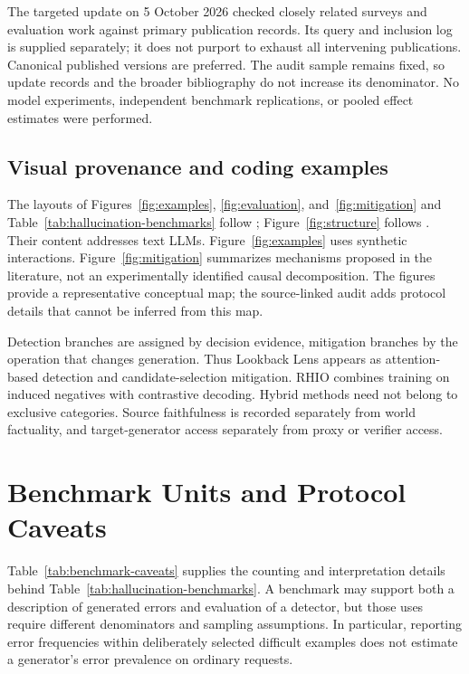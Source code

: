 The targeted update on 5 October 2026 checked closely related surveys and evaluation work against primary publication records. Its query and inclusion log is supplied separately; it does not purport to exhaust all intervening publications. Canonical published versions are preferred. The audit sample remains fixed, so update records and the broader bibliography do not increase its denominator. No model experiments, independent benchmark replications, or pooled effect estimates were performed.

\subsection{Visual provenance and coding examples}
The layouts of Figures~\ref{fig:examples}, \ref{fig:evaluation}, and~\ref{fig:mitigation} and Table~\ref{tab:hallucination-benchmarks} follow \citet{liu-etal-2024-lvlm-design}; Figure~\ref{fig:structure} follows \citet{liu-etal-2025-logical-design}. Their content addresses text LLMs. Figure~\ref{fig:examples} uses synthetic interactions. Figure~\ref{fig:mitigation} summarizes mechanisms proposed in the literature, not an experimentally identified causal decomposition. The figures provide a representative conceptual map; the source-linked audit adds protocol details that cannot be inferred from this map.

Detection branches are assigned by decision evidence, mitigation branches by the operation that changes generation. Thus Lookback Lens appears as attention-based detection and candidate-selection mitigation. RHIO combines training on induced negatives with contrastive decoding. Hybrid methods need not belong to exclusive categories. Source faithfulness is recorded separately from world factuality, and target-generator access separately from proxy or verifier access.



\section{Benchmark Units and Protocol Caveats}\label{app:benchmarks}
Table~\ref{tab:benchmark-caveats} supplies the counting and interpretation details behind Table~\ref{tab:hallucination-benchmarks}. A benchmark may support both a description of generated errors and evaluation of a detector, but those uses require different denominators and sampling assumptions. In particular, reporting error frequencies within deliberately selected difficult examples does not estimate a generator's error prevalence on ordinary requests.

